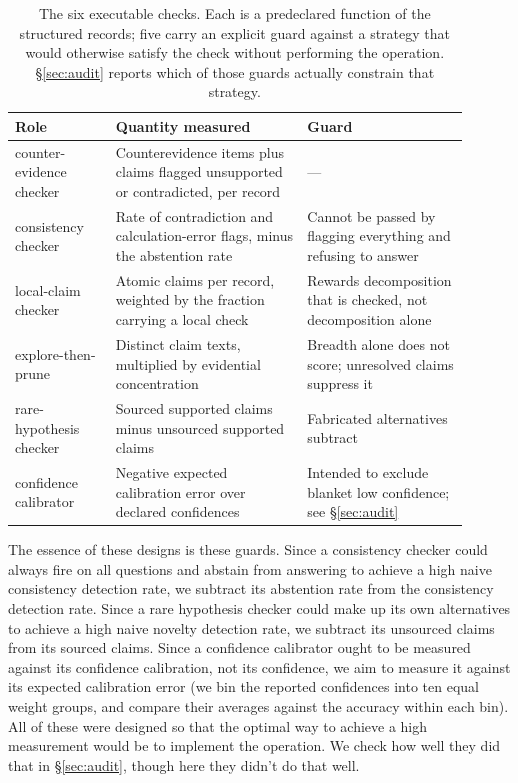\begin{table}[h]
\centering
\small
\begin{tabular}{p{0.20\linewidth}p{0.38\linewidth}p{0.32\linewidth}}
\toprule
Role & Quantity measured & Guard \\
\midrule
counter-evidence checker & Counterevidence items plus claims flagged unsupported or contradicted,
per record & --- \\
consistency checker & Rate of contradiction and calculation-error flags, minus the abstention rate &
Cannot be passed by flagging everything and refusing to answer \\
local-claim checker & Atomic claims per record, weighted by the fraction carrying a local check &
Rewards decomposition that is checked, not decomposition alone \\
explore-then-prune & Distinct claim texts, multiplied by evidential concentration & Breadth alone
does not score; unresolved claims suppress it \\
rare-hypothesis checker & Sourced supported claims minus unsourced supported claims & Fabricated
alternatives subtract \\
confidence calibrator & Negative expected calibration error over declared confidences & Intended to
exclude blanket low confidence; see \S\ref{sec:audit} \\
\bottomrule
\end{tabular}
\caption{The six executable checks. Each is a predeclared function of the structured records; five
carry an explicit guard against a strategy that would otherwise satisfy the check without performing
the operation. \S\ref{sec:audit} reports which of those guards actually constrain that strategy.}
\label{tab:check-specs}
\end{table}

The essence of these designs is these guards. Since a consistency checker could always fire on all
questions and abstain from answering to achieve a high naive consistency detection rate, we subtract
its abstention rate from the consistency detection rate. Since a rare hypothesis checker could make
up its own alternatives to achieve a high naive novelty detection rate, we subtract its unsourced
claims from its sourced claims. Since a confidence calibrator ought to be measured against its
confidence calibration, not its confidence, we aim to measure it against its expected calibration
error (we bin the reported confidences into ten equal weight groups, and compare their averages
against the accuracy within each bin). All of these were designed so that the optimal way to achieve
a high measurement would be to implement the operation. We check how well they did that in
\S\ref{sec:audit}, though here they didn't do that well.

